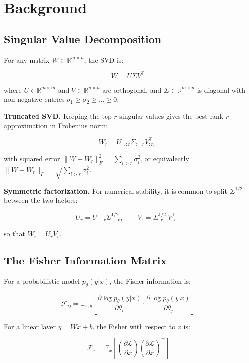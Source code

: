 
\section{Background}

\subsection{Singular Value Decomposition}

For any matrix $W \in \mathbb{R}^{m \times n}$, the SVD is:

\[
W = U \Sigma V^\top
\tag{3.1}
\]

where $U \in \mathbb{R}^{m \times m}$ and $V \in \mathbb{R}^{n \times n}$ are 
orthogonal, and $\Sigma \in \mathbb{R}^{m \times n}$ is diagonal with 
non-negative entries $\sigma_1 \geq \sigma_2 \geq \dots \geq 0$.

\textbf{Truncated SVD.} Keeping the top-$r$ singular values gives the best rank-$r$ 
approximation in Frobenius norm:

\[
W_r = U_{:, :r} \Sigma_{:, :r} V_{:r, :}^\top
\tag{3.2}
\]

with squared error $\|W - W_r\|_F^2 = \sum_{i > r} \sigma_i^2$, or equivalently $\|W - W_r\|_F = \sqrt{\sum_{i > r} \sigma_i^2}$.

\textbf{Symmetric factorization.} For numerical stability, it is common to split 
$\Sigma^{1/2}$ between the two factors:

\[
U_r = U_{:, :r} \Sigma_{:, :r}^{1/2}, \qquad
V_r = \Sigma_{:r, :}^{1/2} V_{:r, :}^\top
\tag{3.3}
\]

so that $W_r = U_r V_r$.

\subsection{The Fisher Information Matrix}

For a probabilistic model $p_\theta(y | x)$, the Fisher information is:

\[
\mathcal{F}_{ij} = \mathbb{E}_{x, y}\!\left[\frac{\partial \log p_\theta(y | x)}{\partial \theta_i} \cdot \frac{\partial \log p_\theta(y | x)}{\partial \theta_j}\right]
\tag{3.4}
\]

For a linear layer $y = Wx + b$, the Fisher with respect to $x$ is:

\[
\mathcal{F}_x = \mathbb{E}_{x}\!\left[\left(\frac{\partial \mathcal{L}}{\partial x}\right) \left(\frac{\partial \mathcal{L}}{\partial x}\right)^\top\right]
\tag{3.5}
\]


